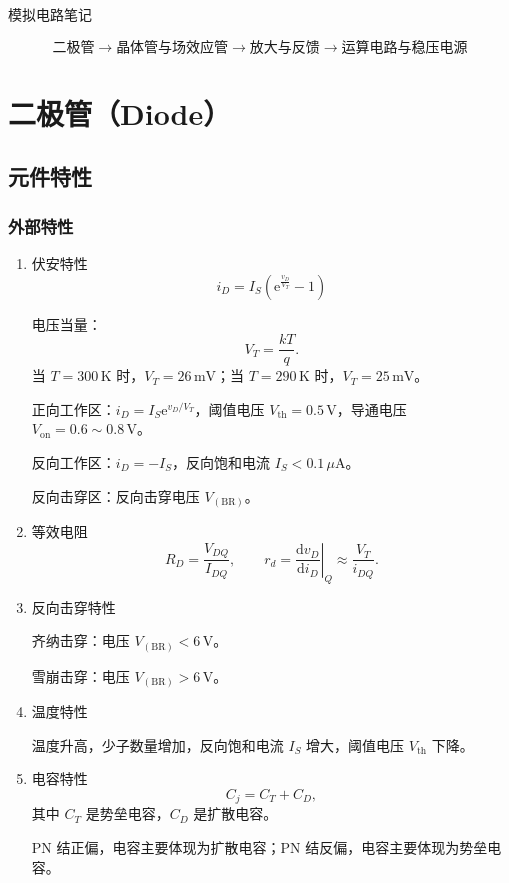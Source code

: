 \documentclass[UTF8,fontset=fandol,zihao=5]{ctexart}
\newcommand{\ee}{\mathrm{e}}
\newcommand{\dd}{\mathrm{d}}
\begin{document}
\begin{center}
  {\heiti\headingfont{}\color{main} 模拟电路笔记}
\end{center}

\vspace{0.45em}

\begin{relationbox}
\[
  \boxed{\text{二极管}}
  \longrightarrow
  \boxed{\text{晶体管与场效应管}}
  \longrightarrow
  \boxed{\text{放大与反馈}}
  \longrightarrow
  \boxed{\text{运算电路与稳压电源}}
\]
\end{relationbox}

\section{二极管（Diode）}

\subsection{元件特性}

\subsubsection{外部特性}

\begin{enumerate}
  \item 伏安特性
  \[
    i_D=I_S\left(\ee^{\frac{v_D}{V_T}}-1\right)
  \]

  电压当量：
  \[
    V_T=\frac{kT}{q}.
  \]
  当 $T=300\,\mathrm K$ 时，$V_T=26\,\mathrm{mV}$；当 $T=290\,\mathrm K$ 时，$V_T=25\,\mathrm{mV}$。

  正向工作区：$i_D=I_S\ee^{v_D/V_T}$，阈值电压 $V_{\mathrm{th}}=0.5\,\mathrm V$，导通电压 $V_{\mathrm{on}}=0.6\sim0.8\,\mathrm V$。

  反向工作区：$i_D=-I_S$，反向饱和电流 $I_S<0.1\,\mu\mathrm A$。

  反向击穿区：反向击穿电压 $V_{(\mathrm{BR})}$。

  \item 等效电阻
  \[
    R_D=\frac{V_{DQ}}{I_{DQ}},
    \qquad
    r_d=\left.\frac{\dd v_D}{\dd i_D}\right|_Q\approx\frac{V_T}{i_{DQ}}.
  \]

  \item 反向击穿特性

  齐纳击穿：电压 $V_{(\mathrm{BR})}<6\,\mathrm V$。

  雪崩击穿：电压 $V_{(\mathrm{BR})}>6\,\mathrm V$。

  \item 温度特性

  温度升高，少子数量增加，反向饱和电流 $I_S$ 增大，阈值电压 $V_{\mathrm{th}}$ 下降。

  \item 电容特性
  \[
    C_j=C_T+C_D,
  \]
  其中 $C_T$ 是势垒电容，$C_D$ 是扩散电容。

  PN 结正偏，电容主要体现为扩散电容；PN 结反偏，电容主要体现为势垒电容。
\end{enumerate}
\end{document}
